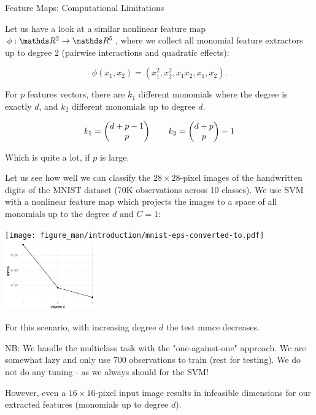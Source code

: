 \begin{vbframe}{Feature Maps: Computational Limitations}

Let us have a look at a similar nonlinear feature map $\phi: \R^2 \to \R^5$, where we collect all monomial feature extractors up to degree $2$ (pairwise interactions and quadratic effects):

$$
\phi(x_1, x_2) = (x_1^2, x_2^2, x_1  x_2, x_1, x_2).
$$

For $p$ features vectors, there are $k_1$ different monomials where the degree is exactly $d$, and $k_2$ different monomials up to degree $d$.


$$
k_1 = \begin{pmatrix} d + p - 1 \\ p \end{pmatrix} \qquad k_2 = \begin{pmatrix} d + p \\ p \end{pmatrix}-1
$$

Which is quite a lot, if $p$ is large.

\framebreak 
\begin{footnotesize}
Let us see how well we can classify the $28 \times 28$-pixel images of the handwritten digits of the MNIST dataset (70K observations across 10 classes). 
We use SVM with a nonlinear feature map which projects the images to a space of all monomials up to the degree $d$ and $C=1$:


\begin{center}
\texttt{[image: figure\_man/introduction/mnist-eps-converted-to.pdf]} ~~~ \includegraphics[width=4cm]{figure/mnist_svm_mmce.png}
\end{center}




\vspace{.3cm}
For this scenario, with increasing degree $d$ the test mmce decreases.

\vfill

NB: We handle the multiclass task with the "one-against-one" approach. 
We are somewhat lazy and only use 700 observations to train (rest for testing).
We do not do any tuning - as we always should for the SVM!

\end{footnotesize}

\framebreak

However, even a $16 \times 16$-pixel input image results in infeasible dimensions for our extracted features (monomials up to degree $d$).


\end{vbframe}
